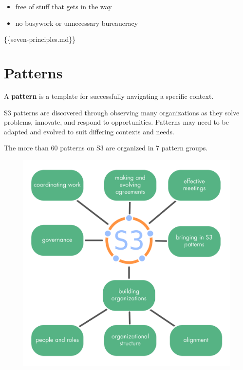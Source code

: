 \begin{itemize}
\item free of stuff that gets in the way

\item no busywork or unnecessary bureaucracy

\end{itemize}

\{\{seven-principles.md\}\}

\chapter{Patterns}
\label{patterns}

A \textbf{pattern} is a template for successfully navigating a specific context.

S3 patterns are discovered through observing many organizations as they solve problems, innovate, and respond to opportunities. Patterns may need to be adapted and evolved to suit differing contexts and needs.

The more than 60 patterns on S3 are organized in 7 pattern groups.

\begin{figure}[htbp]
\centering
\includegraphics[keepaspectratio,width=\textwidth,height=0.75\textheight]{img/general/s3-pattern-groups.png}
\end{figure}

